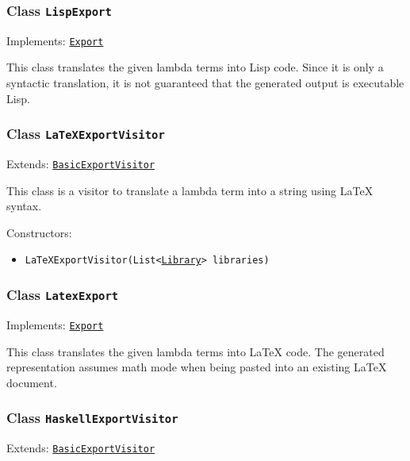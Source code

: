 \subsubsection{Class \texttt{LispExport}}
\label{type:edu.kit.wavelength.client.view.export.LispExport}
Implements: \texttt{\hyperref[type:edu.kit.wavelength.client.view.export.Export]{Export}}

This class translates the given lambda terms into Lisp code. Since it is only
 a syntactic translation, it is not guaranteed that the generated output is
 executable Lisp.

\subsubsection{Class \texttt{LaTeXExportVisitor}}
\label{type:edu.kit.wavelength.client.view.export.LaTeXExportVisitor}
Extends: \texttt{\hyperref[type:edu.kit.wavelength.client.view.export.BasicExportVisitor]{BasicExportVisitor}}

This class is a visitor to translate a lambda term into a string using
 LaTeX syntax.

Constructors:
\begin{itemize}
\item \texttt{LaTeXExportVisitor(List<\hyperref[type:edu.kit.wavelength.client.model.library.Library]{Library}> libraries)}



\end{itemize}

\subsubsection{Class \texttt{LatexExport}}
\label{type:edu.kit.wavelength.client.view.export.LatexExport}
Implements: \texttt{\hyperref[type:edu.kit.wavelength.client.view.export.Export]{Export}}

This class translates the given lambda terms into LaTeX code. The generated
 representation assumes math mode when being pasted into an existing LaTeX
 document.

\subsubsection{Class \texttt{HaskellExportVisitor}}
\label{type:edu.kit.wavelength.client.view.export.HaskellExportVisitor}
Extends: \texttt{\hyperref[type:edu.kit.wavelength.client.view.export.BasicExportVisitor]{BasicExportVisitor}}

